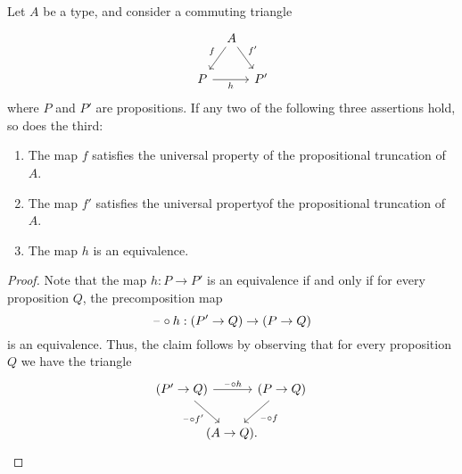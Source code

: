 \begin{prp}
  Let $A$ be a type, and consider a commuting triangle
  \begin{equation*}
    \begin{tikzcd}[column sep=tiny]
      \phantom{P'} & A \arrow[dl,swap,"f"] \arrow[dr,"{f'}"] \\
      P \arrow[rr,swap,"h"] & & P'
    \end{tikzcd}
  \end{equation*}
  where $P$ and $P'$ are propositions. If any two of the following three assertions hold, so does the third:
  \begin{enumerate}
  \item The map $f$ satisfies the universal property of the propositional truncation of $A$.
  \item The map $f'$ satisfies the universal propertyof the propositional truncation of $A$.
  \item The map $h$ is an equivalence.
  \end{enumerate}
\end{prp}

\begin{proof}
  Note that the map $h:P\to P'$ is an equivalence if and only if for every proposition $Q$, the precomposition map
  \begin{equation*}
    \mathord{\hspace{1pt}\text{--}\hspace{1pt}}\circ h:(P'\to Q)\to (P\to Q)
  \end{equation*}
  is an equivalence. Thus, the claim follows by observing that for every proposition $Q$ we have the triangle
  \begin{equation*}
    \begin{tikzcd}[column sep=-1em]
      (P'\to Q) \arrow[rr,"\blank\circ h"] \arrow[dr,swap,"\blank\circ {f'}"] & & (P\to Q) \arrow[dl,"\blank\circ f"] \\
      & (A\to Q). & \phantom{(P'\to Q)}
    \end{tikzcd}
  \end{equation*}
\end{proof}

